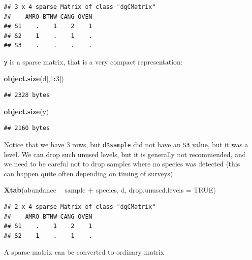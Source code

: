\documentclass[12pt,]{book}
\newenvironment{Shaded}{\begin{snugshade}}{\end{snugshade}}
\newcommand{\DataTypeTok}[1]{\textcolor[rgb]{0.13,0.29,0.53}{#1}}
\newcommand{\DecValTok}[1]{\textcolor[rgb]{0.00,0.00,0.81}{#1}}
\newcommand{\KeywordTok}[1]{\textcolor[rgb]{0.13,0.29,0.53}{\textbf{#1}}}
\newcommand{\NormalTok}[1]{#1}
\newcommand{\OperatorTok}[1]{\textcolor[rgb]{0.81,0.36,0.00}{\textbf{#1}}}
\newcommand{\OtherTok}[1]{\textcolor[rgb]{0.56,0.35,0.01}{#1}}
\newcommand{\StringTok}[1]{\textcolor[rgb]{0.31,0.60,0.02}{#1}}
\begin{document}
\begin{verbatim}
## 3 x 4 sparse Matrix of class "dgCMatrix"
##    AMRO BTNW CANG OVEN
## S1    .    1    2    1
## S2    1    .    1    .
## S3    .    .    .    .
\end{verbatim}

\texttt{y} is a sparse matrix, that is a very compact representation:

\begin{Shaded}
\begin{Highlighting}[]
\KeywordTok{object.size}\NormalTok{(d[,}\DecValTok{1}\OperatorTok{:}\DecValTok{3}\NormalTok{])}
\end{Highlighting}
\end{Shaded}

\begin{verbatim}
## 2328 bytes
\end{verbatim}

\begin{Shaded}
\begin{Highlighting}[]
\KeywordTok{object.size}\NormalTok{(y)}
\end{Highlighting}
\end{Shaded}

\begin{verbatim}
## 2160 bytes
\end{verbatim}

Notice that we have 3 rows, but \texttt{d\$sample} did not have an \texttt{S3} value, but it was a level.
We can drop such unused levels, but it is generally not recommended, and we need to be careful
not to drop samples where no species was detected (this can happen quite often depending on timing of
surveys)

\begin{Shaded}
\begin{Highlighting}[]
\KeywordTok{Xtab}\NormalTok{(abundance }\OperatorTok{~}\StringTok{ }\NormalTok{sample }\OperatorTok{+}\StringTok{ }\NormalTok{species, d, }\DataTypeTok{drop.unused.levels =} \OtherTok{TRUE}\NormalTok{)}
\end{Highlighting}
\end{Shaded}

\begin{verbatim}
## 2 x 4 sparse Matrix of class "dgCMatrix"
##    AMRO BTNW CANG OVEN
## S1    .    1    2    1
## S2    1    .    1    .
\end{verbatim}

A sparse matrix can be converted to ordinary matrix
\end{document}
